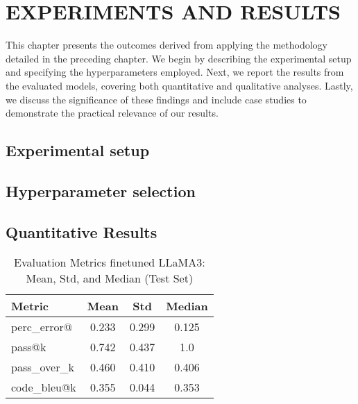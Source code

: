 \captionsetup[lstlisting]{font=small,labelfont=bf}



\chapter{ EXPERIMENTS AND RESULTS}

This chapter presents the outcomes derived from applying the methodology detailed in the preceding chapter. We begin by describing the experimental setup and specifying the hyperparameters employed. Next, we report the results from the evaluated models, covering both quantitative and qualitative analyses. Lastly, we discuss the significance of these findings and include case studies to demonstrate the practical relevance of our results.

\section{Experimental setup}

\section{Hyperparameter selection}

\section{Quantitative Results}


\begin{table}[h!]
\centering
\caption{Evaluation Metrics finetuned LLaMA3: Mean, Std, and Median (Test Set)}
{%
\begin{tabular}{l|ccc}
\toprule
\textbf{Metric} & \textbf{Mean} & \textbf{Std} & \textbf{Median} \\
\midrule
perc\_error@ & 0.233 & 0.299 & 0.125 \\
pass@k    & 0.742 & 0.437 & 1.0   \\
pass\_over\_k  & 0.460 & 0.410 & 0.406 \\
code\_bleu@k  & 0.355 & 0.044 & 0.353 \\
\bottomrule
\end{tabular}
}
\label{tab:metrics_generated}
\end{table}

